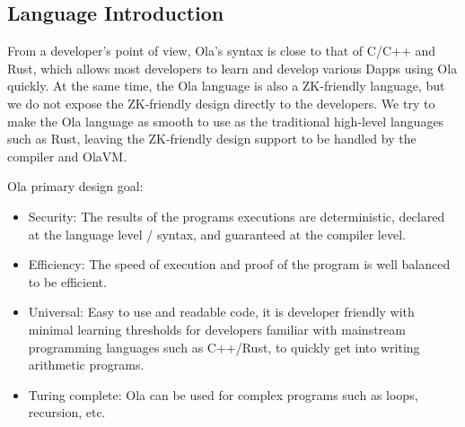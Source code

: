\subsection{Language Introduction}\label{section: ola-lang-language-introduction}

From a developer’s point of view, Ola’s syntax is close to that of C/C++ and Rust, which allows most developers to learn and develop various Dapps using Ola quickly.
At the same time, the Ola language is also a ZK-friendly language, but we do not expose the ZK-friendly design directly to the developers.
We try to make the Ola language as smooth to use as the traditional high-level languages such as Rust, leaving the ZK-friendly design support to be handled by the compiler and OlaVM.

Ola primary design goal:

    \begin{itemize}
        \item Security: The results of the programs executions are deterministic, declared at the language level / syntax, and guaranteed at the compiler level.

        \item Efficiency: The speed of execution and proof of the program is well balanced to be efficient.

        \item Universal: Easy to use and readable code, it is developer friendly with minimal learning thresholds for developers familiar with mainstream programming languages such as C++/Rust, to quickly get into writing arithmetic programs.

        \item Turing complete: Ola can be used for complex programs such as loops, recursion, etc.
    \end{itemize}
